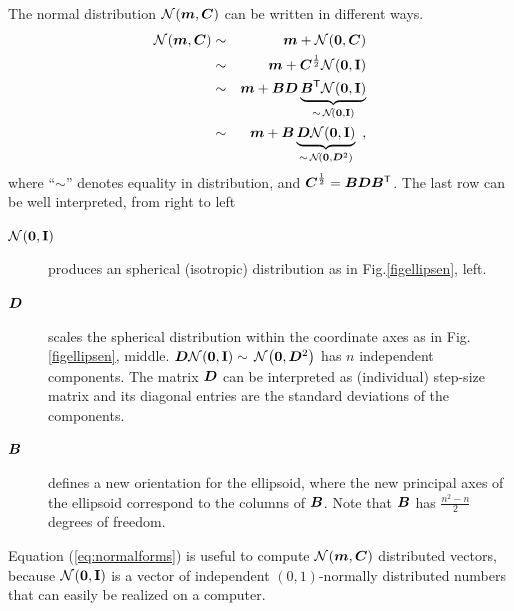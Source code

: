 \documentclass{article} %
\newcommand{\ve}[1]{\mathchoice{\mbox{\boldmath$\displaystyle#1$}}
  {\mbox{\boldmath$\textstyle#1$}} {\mbox{\boldmath$\scriptstyle#1$}}
  {\mbox{\boldmath$\scriptscriptstyle#1$}}}
\newcommand{\ma}[1]{\mathchoice{\mbox{\boldmath$\displaystyle#1$}}
  {\mbox{\boldmath$\textstyle#1$}} {\mbox{\boldmath$\scriptstyle#1$}}
  {\mbox{\boldmath$\scriptscriptstyle#1$}}}
\newcommand{\T}{\ensuremath{\mathsf{T}}}
\newcommand{\Normal}[1]{{\mathcal N}\hspace{-0.13em}\left(#1\right)}
\newcommand{\Id}{\mathbf{I}}
\newcommand{\NormalNullI}{{\mathcal N}
        \hspace{-0.13em}\left({\ve{0},\Id}\right)}
\newcommand{\sqrtC}[1]{{\ma{C}\ifthenelse{%
        \equal{#1}{}}{}{^{(#1)}}}^{\frac{1}{2}}}
\newcommand{\pref}[1]{\mbox{.\hspace{0.235em}\ref{#1}}}
\newcommand{\Eqref}[1]{Equation (\ref{#1})}
\begin{document}
{The normal distribution $\Normal{\ve{m}, \ma{C}}$ can be written in
different ways.
\begin{eqnarray}
  \label{eq:normalforms}
\Normal{\ve{m},\ma{C}}&\sim&
\ve{m}+\Normal{\ve{0},\ma{C}}\nonumber\\&\sim&
\ve{m}+\sqrtC{}\NormalNullI \nonumber\\&\sim& 
\ve{m}+\ma{B}\ma{D}\underbrace{\ma{B}^\T\NormalNullI}_{\sim\,\NormalNullI}
            \nonumber\\&\sim&
\ve{m}+\ma{B}\underbrace{\ma{D}\NormalNullI}_{\sim\,\Normal{\ve{0},\ma{D}^2}}  \enspace, 
\end{eqnarray}
where ``$\sim$'' denotes equality in distribution, and
$\sqrtC{}=\ma{B}\ma{D}\ma{B}^\T$. The last row can be well
interpreted, from right to left
\begin{description}
\item[$\NormalNullI$] produces an spherical (isotropic) distribution
  as in Fig\pref{figellipsen}, left.
\item[$\ma{D}$] scales the spherical distribution within the coordinate
  axes as in Fig\pref{figellipsen},
  middle. $\ma{D}\NormalNullI\sim\,\Normal{\ve{0},\ma{D}^2}$ has $n$
  independent components. The matrix $\ma{D}$ can be interpreted as
  (individual) step-size matrix and its diagonal entries are the standard
  deviations of the components.
\item[$\ma{B}$] defines a new orientation for the ellipsoid, where the
  new principal axes of the ellipsoid correspond to the columns of
  $\ma{B}$. Note that $\ma{B}$ has $\frac{n^2-n}{2}$ degrees of freedom. 
\end{description}
%
\Eqref{eq:normalforms} is useful to compute $\Normal{\ve{m},\ma{C}}$
distributed vectors, because $\NormalNullI$ is a vector of
independent $(0,1)$-normally distributed numbers that can easily be
realized on a computer.
%

}
\end{document}
